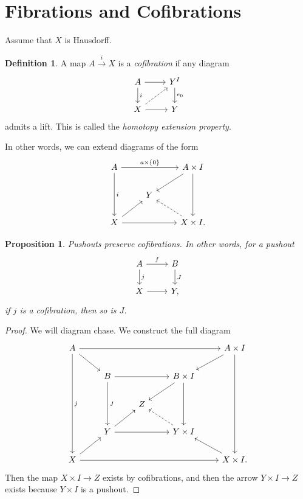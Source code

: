 \documentclass[leqno, openany]{memoir}
\newtheorem{prop}[thm]{Proposition}
\theoremstyle{definition}
\newtheorem{defn}[thm]{Definition}
\theoremstyle{remark}
\theoremstyle{plain}
\theoremstyle{definition}
\theoremstyle{remark}
\begin{document}
\section{Fibrations and Cofibrations}%
\label{sec:fibrations_and_cofibrations}

Assume that $X$ is Hausdorff. 

\begin{defn}
    A map $ A \xrightarrow{i} X$ is a \textit{cofibration} if any diagram
    \begin{equation}
    \begin{tikzcd}
        A \arrow{r} \arrow{d}{i} & Y^I \arrow{d}{e_0} \\
        X \arrow{r} \arrow[dashrightarrow]{ur} & Y
    \end{tikzcd}
    \end{equation}
    admits a lift. This is called the \textit{homotopy extension property}. 
\end{defn}

In other words, we can extend diagrams of the form
\begin{equation}
\begin{tikzcd}
    A \arrow{rr}{a \times \{0\}} \arrow{dd}{i} & & A \times I \arrow{dd} \arrow{dl} \\
                                               & Y & \\
    X \arrow{rr} \arrow{ur} & & X \times I. \arrow[dashrightarrow]{ul}
\end{tikzcd}
\end{equation}

\begin{prop}
    Pushouts preserve cofibrations. In other words, for a pushout
    \begin{equation}
    \begin{tikzcd}
        A \arrow{r}{f} \arrow{d}{j} & B \arrow{d}{J} \\
        X \arrow{r} & Y,
    \end{tikzcd}
    \end{equation}
    if $j$ is a cofibration, then so is $J$.
\end{prop}

\begin{proof}
    We will diagram chase. We construct the full diagram
    \begin{equation}
    \begin{tikzcd}
        A \arrow{rrrr} \arrow{dddd}{j} \arrow{dr} & & & & A \times I \arrow{dl} \arrow{dddd} \\
        & B \arrow{rr} \arrow{dd}{J} & & B \times I \arrow{dl} \arrow{dd} \\
        & & Z \\
        & Y \arrow{rr} \arrow{ur} & & Y \times I \arrow[dashrightarrow]{ul} \\
        X \arrow{ur} \arrow{rrrr} & & & & X \times I. \arrow{ul}
    \end{tikzcd}
    \end{equation}
    Then the map $X \times I \to Z$ exists by cofibrations, and then the arrow $Y \times I \to Z$ exists because $Y \times I$ is a pushout.
\end{proof}
\end{document}
